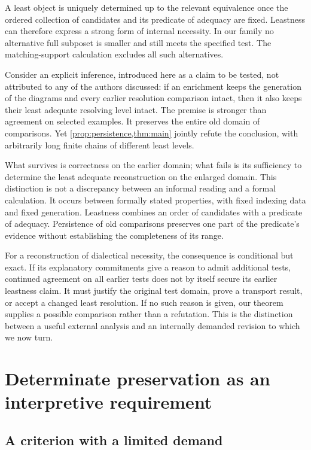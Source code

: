 A least object is uniquely determined up to the relevant equivalence once
the ordered collection of candidates and its predicate of adequacy are
fixed. Leastness can therefore express a strong form of internal necessity.
In our family no alternative full subposet is smaller and still meets the
specified test. The matching-support calculation excludes all such alternatives.

Consider an explicit inference, introduced here as a claim to be tested,
not attributed to any of the authors discussed: if an enrichment keeps the
generation of the diagrams and every earlier resolution comparison intact,
then it also keeps their least adequate resolving level intact. The premise
is stronger than agreement on selected examples. It preserves the entire
old domain of comparisons. Yet \cref{prop:persistence,thm:main} jointly
refute the conclusion, with arbitrarily long finite chains of different
least levels.

What survives is correctness on the earlier domain; what fails is its
sufficiency to determine the least adequate reconstruction on the enlarged
domain. This distinction is not a discrepancy between an informal reading
and a formal calculation. It occurs between formally stated properties,
with fixed indexing data and fixed generation. Leastness combines an order
of candidates with a predicate of adequacy. Persistence of old comparisons
preserves one part of the predicate's evidence without establishing the
completeness of its range.

For a reconstruction of dialectical necessity, the consequence is conditional
but exact. If its explanatory commitments give a reason to admit additional
tests, continued agreement on all earlier tests does not by itself secure
its earlier leastness claim. It must justify the original test domain,
prove a transport result, or accept a changed least resolution. If no such
reason is given, our theorem supplies a possible comparison rather than a
refutation. This is the distinction between a useful external analysis and
an internally demanded revision to which we now turn.

\section{Determinate preservation as an interpretive requirement}
\label{sec:preservation}

\subsection{A criterion with a limited demand}

